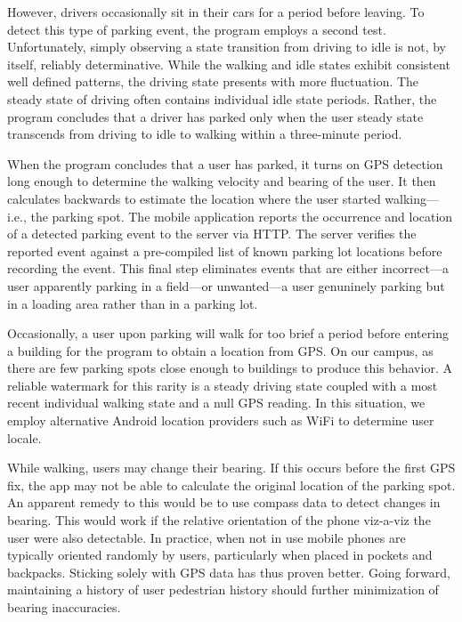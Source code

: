 However, drivers occasionally sit in their cars for a period before leaving.
To detect this type of parking event, the program employs a second test.
Unfortunately, simply observing a state transition from driving to idle is
not, by itself, reliably determinative. While the walking and idle states
exhibit consistent well defined patterns, the driving state presents with
more fluctuation. The steady state of driving often contains individual idle
state periods. Rather, the program concludes that a driver has parked only
when the user steady state transcends from driving to idle to walking within
a three-minute period.

When the program concludes that a user has parked, it turns on GPS detection
long enough to determine the walking velocity and bearing of the user. It
then calculates backwards to estimate the location where the user started
walking---i.e., the parking spot. The mobile application reports the
occurrence and location of a detected parking event to the server via HTTP.
The server verifies the reported event against a pre-compiled list of known
parking lot locations before recording the event. This final step eliminates
events that are either incorrect---a user apparently parking in a field---or
unwanted---a user genuninely parking but in a loading area rather than in a
parking lot.

Occasionally, a user upon parking will walk for too brief a period before
entering a building for the program to obtain a location from GPS. On our
campus, as there are few parking spots close enough to buildings to produce
this behavior. A reliable watermark for this rarity is a steady driving state
coupled with a most recent individual walking state and a null GPS reading.
In this situation, we employ alternative Android location providers such as
WiFi to determine user locale.

While walking, users may change their bearing. If this occurs before the
first GPS fix, the app may not be able to calculate the original location of
the parking spot. An apparent remedy to this would be to use compass data to
detect changes in bearing. This would work if the relative orientation of the
phone viz-a-viz the user were also detectable. In practice, when not in use
mobile phones are typically oriented randomly by users, particularly when
placed in pockets and backpacks. Sticking solely with GPS data has thus
proven better. Going forward, maintaining a history of user pedestrian
history should further minimization of bearing inaccuracies.

